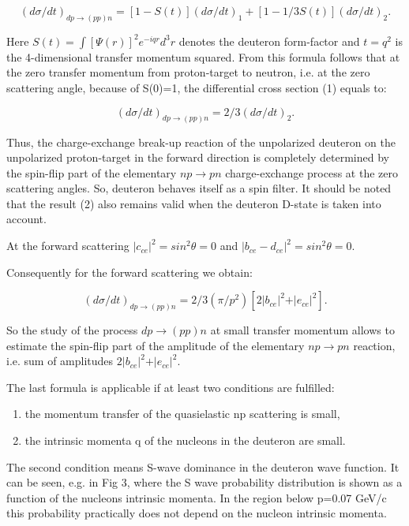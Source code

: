 \documentclass[a4paper,12pt]{article}
\begin{document}
\begin{equation}
  (d \sigma /dt)_{dp\rightarrow(pp)n} = [1-S(t)] (d \sigma /dt)_{1}+ [1-1/3S(t)]
  (d \sigma /dt)_{2}.
\end{equation}

Here
$S(t)= \int [\Psi(r)]^{2}e^{-iqr}d^{3}r$
denotes the deuteron form-factor and $t=q^2$ is the 4-dimensional transfer
momentum squared. From this formula follows that at the zero transfer momentum
from proton-target to neutron, i.e. at the zero scattering angle, because of
S(0)=1, the differential cross section (1) equals to:

\begin{equation}
  (d \sigma /dt)_{dp\rightarrow(pp)n} = 2/3 (d \sigma /dt)_{2}.
\end{equation}

Thus, the charge-exchange break-up reaction of the unpolarized deuteron on the
unpolarized proton-target in the forward direction is completely determined by
the spin-flip part of the elementary $np \to pn$ charge-exchange process at the
zero scattering angles. So, deuteron behaves itself as a spin filter. It should
be noted that the result (2) also remains valid when the deuteron D-state is
taken into account.

At the forward scattering $\vert c_{ce}\vert ^2 = sin^2 \theta =0$ and
$\vert b_{ce}-d_{ce}\vert ^2 = sin^2 \theta = 0$.

Consequently for the forward scattering we obtain:

\begin{equation}
  (d \sigma /dt)_{dp\rightarrow(pp)n} = 2/3 (\pi/p^{2})[ 2\vert b_{ce}%
    \vert ^{2}+ \vert e_{ce} \vert ^{2}].
\end{equation}

So the study of the process $dp\to (pp)n$ at small transfer momentum allows to
estimate the spin-flip part of the amplitude of the elementary $np\to pn$
reaction, i.e. sum of amplitudes $2\vert b_{ce}\vert ^2+\vert e_{ce}\vert ^2$.

The last formula is applicable if at least two conditions are fulfilled:

\begin{enumerate}
\item the momentum transfer of the quasielastic np scattering is small,
\item the intrinsic momenta q of the nucleons in the deuteron are small.
\end{enumerate}

The second condition means S-wave dominance in the deuteron wave function. It
can be seen, e.g. in Fig 3, where the S wave probability distribution is shown
as a function of the nucleons intrinsic momenta. In the region below p=0.07
GeV/c this probability practically does not depend on the nucleon intrinsic
momenta.
\end{document}
